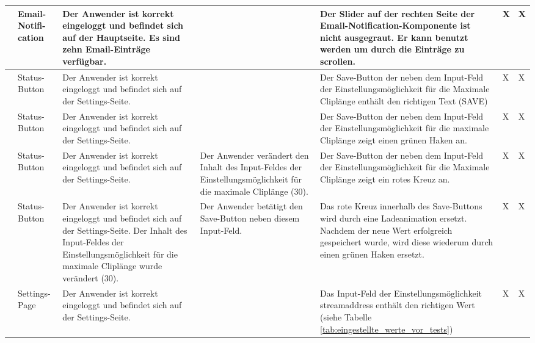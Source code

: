 \begin{longtable}{| p{} | p{} | p{} | p{} | p{} | p{} | p{} |}
	\stepcounter{TestNumber}\arabic{TestNumber} & Email-Notifi-cation & Der Anwender ist korrekt eingeloggt und befindet sich auf der Hauptseite. Es sind zehn Email-Einträge verfügbar. & & Der Slider auf der rechten Seite der Email-Notification-Komponente ist nicht ausgegraut. Er kann benutzt werden um durch die Einträge zu scrollen. & X & X \\ \hline
	
	\stepcounter{TestNumber}\arabic{TestNumber} & Status-Button & Der Anwender ist korrekt eingeloggt und befindet sich auf der Settings-Seite. & & Der Save-Button der neben dem Input-Feld der Einstellungsmöglichkeit für die Maximale Cliplänge enthält den richtigen Text (SAVE) & X & X \\ \hline
	
	\stepcounter{TestNumber}\arabic{TestNumber} & Status-Button & Der Anwender ist korrekt eingeloggt und befindet sich auf der Settings-Seite. & & Der Save-Button der neben dem Input-Feld der Einstellungsmöglichkeit für die maximale Cliplänge zeigt einen grünen Haken an. & X & X \\ \hline
	
	\stepcounter{TestNumber}\arabic{TestNumber} & Status-Button & Der Anwender ist korrekt eingeloggt und befindet sich auf der Settings-Seite. & Der Anwender verändert den Inhalt des Input-Feldes der Einstellungsmöglichkeit für die maximale Cliplänge (30). & Der Save-Button der neben dem Input-Feld der Einstellungsmöglichkeit für die Maximale Cliplänge zeigt ein rotes Kreuz an. & X & X \\ \hline
	
	\stepcounter{TestNumber}\arabic{TestNumber} & Status-Button & Der Anwender ist korrekt eingeloggt und befindet sich auf der Settings-Seite. Der Inhalt des Input-Feldes der Einstellungsmöglichkeit für die maximale Cliplänge wurde verändert (30). & Der Anwender betätigt den Save-Button neben diesem Input-Feld. & Das rote Kreuz innerhalb des Save-Buttons wird durch eine Ladeanimation ersetzt. Nachdem der neue Wert erfolgreich gespeichert wurde, wird diese wiederum durch einen grünen Haken ersetzt. & X & X \\ \hline
	
	\stepcounter{TestNumber}\arabic{TestNumber} & Settings-Page & Der Anwender ist korrekt eingeloggt und befindet sich auf der Settings-Seite. & & Das Input-Feld der Einstellungsmöglichkeit streamaddress enthält den richtigen Wert (siehe Tabelle \ref{tab:eingestellte_werte_vor_tests}) & X & X \\ \hline
	

\end{longtable}
